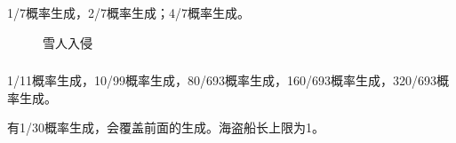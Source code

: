 \subsubsection{}
1/7概率生成，2/7概率生成；4/7概率生成。
\begin{figure}[!ht]
    \centering
    \caption{雪人入侵}
\end{figure}

\subsubsection{}
1/11概率生成，10/99概率生成，80/693概率生成，160/693概率生成，320/693概率生成。

有1/30概率生成，会覆盖前面的生成。海盗船长上限为1。

